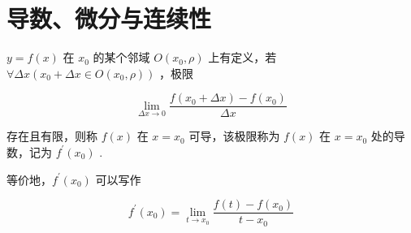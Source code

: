 \section{导数、微分与连续性}
\begin{definition}
	$y=f(x)$ 在 $x_0$ 的某个邻域 $O\left(x_0, \rho\right)$ 上有定义，若 $\forall \Delta x\left(x_0+\Delta x \in O\left(x_0, \rho\right)\right)$ ，极限
	
	$$
	\lim _{\Delta x \rightarrow 0} \frac{f\left(x_0+\Delta x\right)-f\left(x_0\right)}{\Delta x}
	$$
	
	
	存在且有限，则称 $f(x)$ 在 $x=x_0$ 可导，该极限称为 $f(x)$ 在 $x=x_0$ 处的导数，记为 $f^{\prime}\left(x_0\right)$ .
	

\end{definition}	等价地，$f^{\prime}\left(x_0\right)$ 可以写作

$$
f^{\prime}\left(x_0\right)=\lim _{t \rightarrow x_0} \frac{f(t)-f\left(x_0\right)}{t-x_0}
$$


